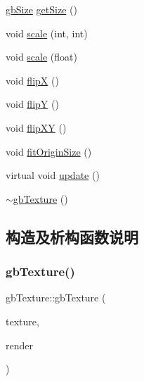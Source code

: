 \begin{DoxyCompactItemize}
\item 
\mbox{\hyperlink{classgb_size}{gb\+Size}} \mbox{\hyperlink{classgb_texture_a3ecd2c1dfa7bf44db57883a85564f182}{get\+Size}} ()
\item 
void \mbox{\hyperlink{classgb_texture_a0946db96987076bf9651711af3734342}{scale}} (int, int)
\item 
void \mbox{\hyperlink{classgb_texture_aae98dffb479b47171abd3025dbf53bd4}{scale}} (float)
\item 
void \mbox{\hyperlink{classgb_texture_abbccc677a55cff11d466a3ca9421a526}{flipX}} ()
\item 
void \mbox{\hyperlink{classgb_texture_a4548f6e08d2580c28d52a38ed1c09d6d}{flipY}} ()
\item 
void \mbox{\hyperlink{classgb_texture_aac482919f76665dc6c0fde66828376c3}{flip\+XY}} ()
\item 
void \mbox{\hyperlink{classgb_texture_a9de73627cbfa8906a508de183b99f550}{fit\+Origin\+Size}} ()
\item 
virtual void \mbox{\hyperlink{classgb_texture_a0102b5ab04aab53da3a696d21bb92d76}{update}} ()
\item 
\mbox{\hyperlink{classgb_texture_a62b97255ac111f4227852e7a0594bc23}{$\sim$gb\+Texture}} ()
\end{DoxyCompactItemize}


\subsection{构造及析构函数说明}
\mbox{\label{classgb_texture_a709b0b579fb9154b752ae50e165eb3d8}} 
\subsubsection{\texorpdfstring{gbTexture()}{gbTexture()}\hspace{0.1cm}{\footnotesize\ttfamily [1/3]}}
{\footnotesize\ttfamily gb\+Texture\+::gb\+Texture (\begin{DoxyParamCaption}\item[{S\+D\+L\+\_\+\+Texture $\ast$}]{texture,  }\item[{S\+D\+L\+\_\+\+Renderer $\ast$}]{render }\end{DoxyParamCaption})}

\mbox{\label{classgb_texture_ae90e7edb831d00f80d5d5a728638a6b6}} 
